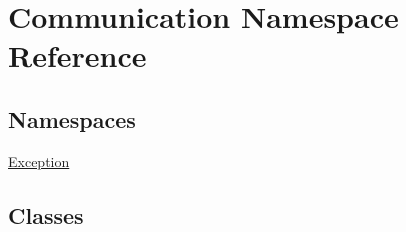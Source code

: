 \hypertarget{namespace_communication}{}\section{Communication Namespace Reference}
\label{namespace_communication}
\subsection*{Namespaces}
\begin{DoxyCompactItemize}
\item 
 \hyperlink{namespace_communication_1_1_exception}{Exception}
\end{DoxyCompactItemize}
\subsection*{Classes}

